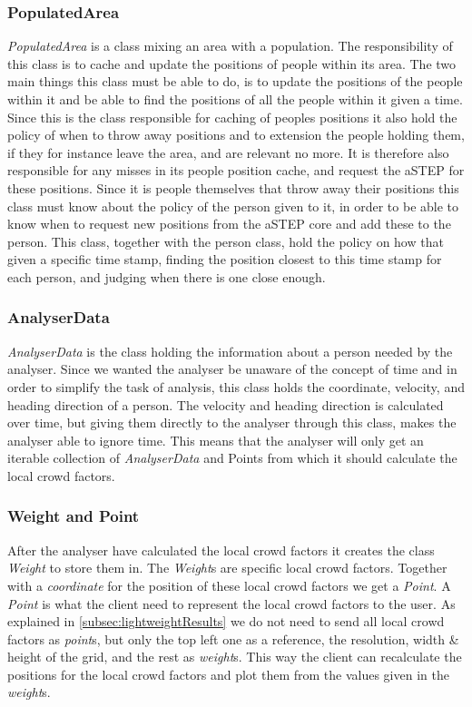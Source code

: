\subsubsection{PopulatedArea}
\emph{PopulatedArea} is a class mixing an area with a population. The responsibility of this class is to cache and update the positions of people within its area. The two main things this class must be able to do, is to update the positions of the people within it and be able to find the positions of all the people within it given a time. Since this is the class responsible for caching of peoples positions it also hold the policy of when to throw away positions and to extension the people holding them, if they for instance leave the area, and are relevant no more. It is therefore also responsible for any misses in its people position cache, and request the aSTEP for these positions. Since it is people themselves that throw away their positions this class must know about the policy of the person given to it, in order to be able to know when to request new positions from the aSTEP core and add these to the person. This class, together with the person class, hold the policy on how that given a specific time stamp, finding the position closest to this time stamp for each person, and judging when there is one close enough.

\subsubsection{AnalyserData}
\emph{AnalyserData} is the class holding the information about a person needed by the analyser. Since we wanted the analyser be unaware of the concept of time and in order to simplify the task of analysis, this class holds the coordinate, velocity, and heading direction of a person. The velocity and heading direction is calculated over time, but giving them directly to the analyser through this class, makes the analyser able to ignore time. This means that the analyser will only get an iterable collection of \emph{AnalyserData} and Points from which it should calculate the local crowd factors. 

\subsubsection{Weight and Point}
After the analyser have calculated the local crowd factors it creates the class \emph{Weight} to store them in. The \emph{Weight}s are specific local crowd factors. Together with a \emph{coordinate} for the position of these local crowd factors we get a \emph{Point}. A \emph{Point} is what the client need to represent the local crowd factors to the user. As explained in \cref{subsec:lightweightResults} we do not need to send all local crowd factors as \emph{point}s, but only the top left one as a reference, the resolution, width \& height of the grid, and the rest as \emph{weight}s. This way the client can recalculate the positions for the local crowd factors and plot them from the values given in the \emph{weight}s.

